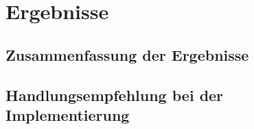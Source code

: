 \section{Ergebnisse}
\subsection{Zusammenfassung der Ergebnisse}
\subsection{Handlungsempfehlung bei der Implementierung}
